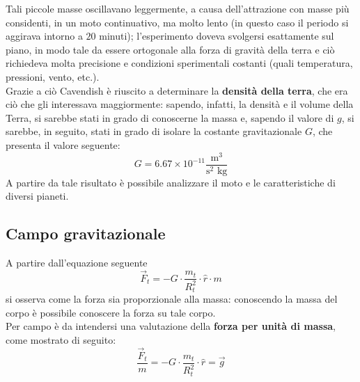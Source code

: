\documentclass[a4paper]{extarticle}
\begin{document}
\noindent
Tali piccole masse oscillavano leggermente, a causa dell'attrazione con masse più considenti, in un moto continuativo, ma molto lento (in questo caso il periodo si aggirava intorno a $20$ minuti); l'esperimento doveva svolgersi esattamente sul piano, in modo tale da essere ortogonale alla forza di gravità della terra e ciò richiedeva molta precisione e condizioni sperimentali costanti (quali temperatura, pressioni, vento, etc.).\\
Grazie a ciò Cavendish è riuscito a determinare la \textbf{densità della terra}, che era ciò che gli interessava maggiormente: sapendo, infatti, la densità e il volume della Terra, si sarebbe stati in grado di conoscerne la massa e, sapendo il valore di $g$, si sarebbe, in seguito, stati in grado di isolare la costante gravitazionale $G$, che presenta il valore seguente:
\[\boxed{G = 6.67 \times 10^{-11} \frac{\text{m}^3}{\text{s}^2 \text{ kg}}}\]
A partire da tale risultato è possibile analizzare il moto e le caratteristiche di diversi pianeti.

\vspace{1em}
\subsection{Campo gravitazionale}
A partire dall'equazione seguente
\[\vec{F}_t = -G \cdot \frac{m_t}{R_t^2} \cdot \hat{r} \cdot m\]
si osserva come la forza sia proporzionale alla massa: conoscendo la massa del corpo è possibile conoscere la forza su tale corpo.\\
Per campo è da intendersi una valutazione della \textbf{forza per unità di massa}, come mostrato di seguito:
\[\boxed{\frac{\vec{F}_t}{m} = -G \cdot \frac{m_t}{R_t^2} \cdot \hat{r} = \vec g}\]
\end{document}

